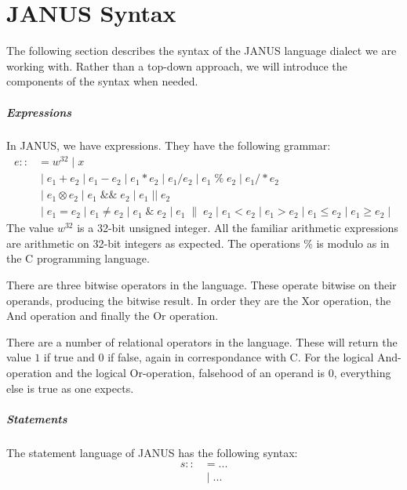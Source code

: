 \chapter{JANUS Syntax}

The following section describes the syntax of the JANUS language
dialect we are working with. Rather than a top-down approach, we will
introduce the components of the syntax when needed.

\paragraph{Expressions}
 
In JANUS, we have expressions. They have the following grammar:
\begin{align*}
  e ::& = w^{32} \;\vert\; x \\
        & \;\vert\; e_1 + e_2 \;\vert\; e_1 - e_2 \;\vert\; e_1 *
          e_2 \;\vert\; e_1 / e_2 \;\vert\; e_1 \;\%\; e_2 \;\vert\; e_1 /\!* e_2 \\
        & \;\vert\; e_1 \otimes e_2 \;\vert\; e_1 \;\&\&\; e_2 \;\vert\;
        e_1 \;||\; e_2 \\
        & \;\vert\; e_1 = e_2 \;\vert\; e_1 \neq e_2 \;\vert\; e_1 \;\&\;
        e_2 \;\vert\; e_1 \;\|\; e_2 \;\vert\; e_1 < e_2 \;\vert\; e_1
        > e_2 \;\vert\; e_1 \leq e_2 \;\vert\;e_1 \geq e_2 \;\vert\;
\end{align*}
The value $w^{32}$ is a 32-bit unsigned integer. All the familiar
arithmetic expressions are arithmetic on 32-bit integers as
expected. The operations $\%$ is modulo as in the C programming
language. 

There are three bitwise operators in the language. These operate
bitwise on their operands, producing the bitwise result. In order they
are the Xor operation, the And operation and finally the Or
operation.

There are a number of relational operators in the language. These will
return the value $1$ if true and $0$ if false, again in correspondance
with C. For the logical And-operation and the logical Or-operation,
falsehood of an operand is $0$, everything else is true as one
expects.

\paragraph{Statements}
The statement language of JANUS has the following syntax:
\begin{align*}
  s ::&= ... \\
      &\;\vert\; ...
\end{align*}

